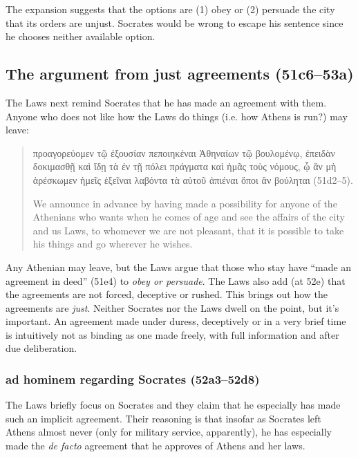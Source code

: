 \documentclass[12pt,letterpaper]{article}
\begin{document}
The expansion suggests that the options are (1) obey or (2) persuade the city that its orders are unjust.
Socrates would be wrong to escape his sentence since he chooses neither available option.

\subsection*{The argument from just agreements (51c6--53a)}

The Laws next remind Socrates that he has made an agreement with them.
Anyone who does not like how the Laws do things (i.e. how Athens is run?) may leave:

\begin{quote}

    \textgreek{προαγορεύομεν τῷ ἐξουσίαν πεποιηκέναι Ἀθηναίων τῷ βουλομένῳ, ἐπειδὰν δοκιμασθῇ καὶ ἴδῃ τὰ ἐν τῇ πόλει πράγματα καὶ ἡμᾶς τοὺς νόμους, ᾧ ἂν μὴ ἀρέσκωμεν ἡμεῖς ἐξεῖναι λαβόντα τὰ αὑτοῦ ἀπιέναι ὅποι ἂν βούληται} (51d2--5).

    We announce in advance by having made a possibility for anyone of the Athenians who wants when he comes of age and see the affairs of the city and us Laws, to whomever we are not pleasant, that it is possible to take his things and go wherever he wishes.

\end{quote}

Any Athenian may leave, but the Laws argue that those who stay have ``made an agreement in deed'' (51e4) to \emph{obey or persuade}.
The Laws also add (at 52e) that the agreements are not forced, deceptive or rushed.
This brings out how the agreements are \emph{just}.
Neither Socrates nor the Laws dwell on the point, but it's important.
An agreement made under duress, deceptively or in a very brief time is intuitively not as binding as one made freely, with full information and after due deliberation.

\subsubsection*{ad hominem regarding Socrates (52a3--52d8)}

The Laws briefly focus on Socrates and they claim that he especially has made such an implicit agreement.
Their reasoning is that insofar as Socrates left Athens almost never (only for military service, apparently), he has especially made the \textit{de facto} agreement that he approves of Athens and her laws.
\end{document}
